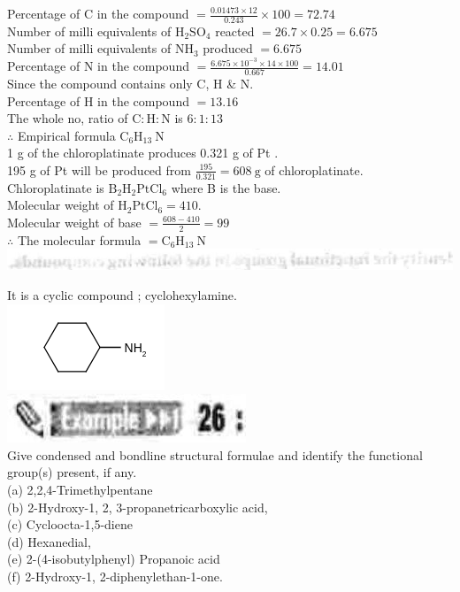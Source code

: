 \documentclass[10pt]{article}
\begin{document}
Percentage of C in the compound $=\frac{0.01473 \times 12}{0.243} \times 100=72.74$\\
Number of milli equivalents of $\mathrm{H}_{2} \mathrm{SO}_{4}$ reacted $=26.7 \times 0.25=6.675$\\
Number of milli equivalents of $\mathrm{NH}_{3}$ produced $=6.675$\\
Percentage of N in the compound $=\frac{6.675 \times 10^{-3} \times 14 \times 100}{0.667}=14.01$\\
Since the compound contains only C, H \& N.\\
Percentage of H in the compound $=13.16$\\
The whole no, ratio of $\mathrm{C}: \mathrm{H}: \mathrm{N}$ is $6: 1: 13$\\
$\therefore$ Empirical formula $\mathrm{C}_{6} \mathrm{H}_{13} \mathrm{~N}$\\
1 g of the chloroplatinate produces 0.321 g of Pt .\\
195 g of Pt will be produced from $\frac{195}{0.321}=608 \mathrm{~g}$ of chloroplatinate.\\
Chloroplatinate is $\mathrm{B}_{2} \mathrm{H}_{2} \mathrm{PtCl}_{6}$ where B is the base.\\
Molecular weight of $\mathrm{H}_{2} \mathrm{PtCl}_{6}=410$.\\
Molecular weight of base $=\frac{608-410}{2}=99$\\
$\therefore$ The molecular formula $=\mathrm{C}_{6} \mathrm{H}_{13} \mathrm{~N}$\\
\includegraphics[max width=\textwidth, center]{2025_01_28_8470952b98110cec3aabg-123(1)}

It is a cyclic compound ; cyclohexylamine.\\
\includegraphics{smile-067ceff3dfaa1fc94af04576343b55ffc4b1ae54}\\
\includegraphics[max width=\textwidth, center]{2025_01_28_8470952b98110cec3aabg-123}\\
Give condensed and bondline structural formulae and identify the functional group(s) present, if any.\\
(a) 2,2,4-Trimethylpentane\\
(b) 2-Hydroxy-1, 2, 3-propanetricarboxylic acid,\\
(c) Cycloocta-1,5-diene\\
(d) Hexanedial,\\
(e) 2-(4-isobutylphenyl) Propanoic acid\\
(f) 2-Hydroxy-1, 2-diphenylethan-1-one.
\end{document}
